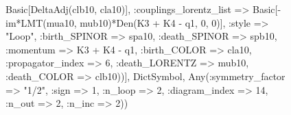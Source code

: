 \documentclass{revtex4}
\begin{document}
\begin{figure}[!htb]
\begin{center}
{Basic[DeltaAdj(clb10, cla10)], :couplings_lorentz_list => Basic[-im*LMT(mua10, mub10)*Den(K3 + K4 - q1, 0, 0)], :style => "Loop", :birth_SPINOR => spa10, :death_SPINOR => spb10, :momentum => K3 + K4 - q1, :birth_COLOR => cla10, :propagator_index => 6, :death_LORENTZ => mub10, :death_COLOR => clb10))], Dict{Symbol, Any}(:symmetry_factor => "1/2", :sign => 1, :n_loop => 2, :diagram_index => 14, :n_out => 2, :n_inc => 2)) 
}
\end{center}
\end{figure}
\end{document}
